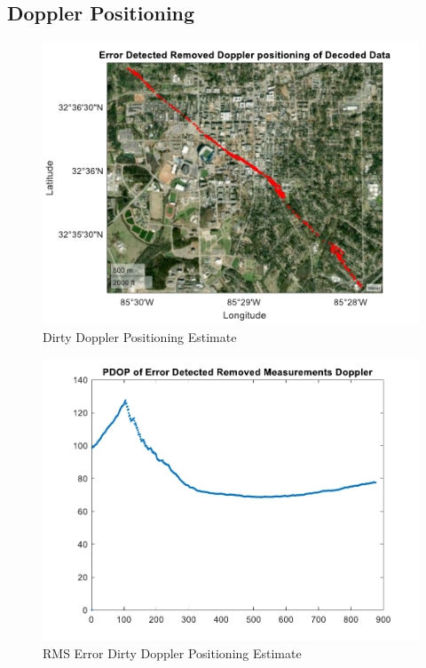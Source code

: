 \documentclass[12pt]{report}
\begin{document}
\subsection{Doppler Positioning}
\begin{figure}[h!]
    \centering
    \includegraphics[width=5in]
    {15min_irid_dirty_dopplerpos.pdf}
    \caption{Dirty Doppler Positioning Estimate}
    \label{fig:DirtyDoppler15minIridPosit}
\end{figure}

\begin{figure}[h!]
    \centering
    \includegraphics[width=5in]
    {15min_irid_dirty_doppler_pdop.pdf}
    \caption{RMS Error Dirty Doppler Positioning Estimate}
    \label{fig:DirtyDoppler15minIridPositpdop}
\end{figure}
\end{document}
